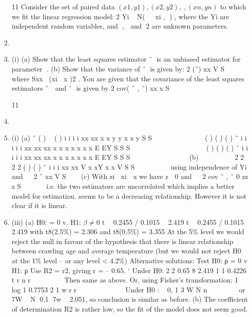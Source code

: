 \documentclass[a4paper,12pt]{article}
\begin{document}
\begin{enumerate}

11 Consider the set of paired data $(x1, y1), (x2 , y2 ),,(xn , yn )$ to which we fit the linear regression model:
  2
Yi ~ N(  xi , ) ,
where the Yi are independent random variables, and ,  and 2 are unknown
parameters.
\item \item (i) (a) Show that the least squares estimator ˆ is an unbiased estimator for
parameter .
(b) Show that the variance of ˆ is given by:
  2
(ˆ)
xx
V
S

 
where Sxx (xi  x )2 .
You are given that the covariance of the least squares estimators ˆ  and ˆ is
given by
2
cov( ˆ , ˆ)
xx
x
S

11 \item \item (i) (a)
ˆ ( )  ( )
i i i i
xx xx
x x y y x x y
S S
  
    
    ( ) ( ) ( )
ˆ i i i i
i
xx xx xx
x x x x x x x
E EY
S S S
  
         
    ( ) ( ) ( )
ˆ i i i i
i
xx xx xx
x x x x x x x
E EY
S S S
  
         
(b)    
   
2 2
2 2
( ) ( )
ˆ i i i
xx xx
V x xY x x
V
S S
  
     using independence of Yi
and   2
ˆ
xx
V
S

 
(c) With zi  xi  x we have z  0 and   2
cov ˆ , ˆ 0
zz
z
S

   
i.e. the two estimators are uncorrelated which implies a better model for estimation.
\itemThere seems to be a decreasing relationship. However it is not clear if it is linear.
\item (iii) (a) H0: \beta = 0 v. H1: $\beta \neq 0$
t  0.2455 / 0.1015  2.419 t  0.2455 / 0.1015  2.419
with t8(2.5\%) = 2.306 and t8(0.5\%) = 3.355
At the 5\% level we would reject the null in favour of the hypothesis that there is linear relationship between crawling age and average
temperature (but we would not reject H0 at the 1\% level – or any
             level < 4.2\%)
Alternative solutions:
  Test H0: ρ = 0 v H1: ρ 
Use R2 = r2, giving r = – 0.65.
` Under H0:
  2
2 0.65 8 2.419
1 1 0.4226
t r n
r
 
  
 
Then same as above.
Or, using Fisher’s transformation:
  1 log 1 0.7753
2 1
w r
r
          
Under H0 :
  ~ 0, 1
3
W N
n
 
    
or 7W ~ N 0,1
7w  2.051, so conclusion is similar as before.
(b) The coefficient of determination R2 is rather low, so the fit of the
model does not seem good.

\end{enumerate}
\end{document}
